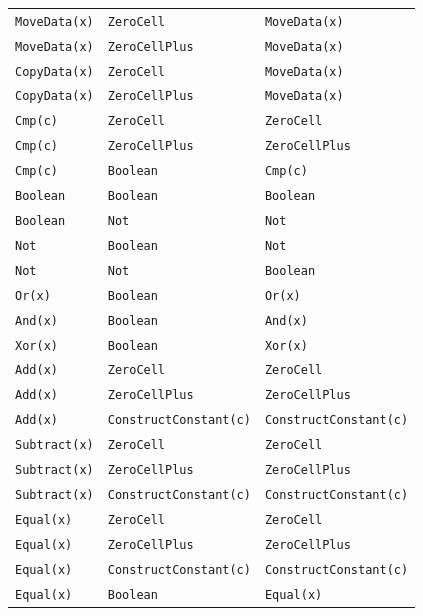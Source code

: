 \begin{longtable}{R{0.27\textwidth}|L{0.27\textwidth}|Q{0.34\textwidth}}
\texttt{MoveData(x)} & \texttt{ZeroCell} & \texttt{MoveData(x)} \\
\texttt{MoveData(x)} & \texttt{ZeroCellPlus} & \texttt{MoveData(x)} \\
\hline

\texttt{CopyData(x)} & \texttt{ZeroCell} & \texttt{MoveData(x)} \\
\texttt{CopyData(x)} & \texttt{ZeroCellPlus} & \texttt{MoveData(x)} \\
\hline

\texttt{Cmp(c)} & \texttt{ZeroCell} & \texttt{ZeroCell} \\
\texttt{Cmp(c)} & \texttt{ZeroCellPlus} & \texttt{ZeroCellPlus} \\
\texttt{Cmp(c)} & \texttt{Boolean} & \texttt{Cmp(c)} \\
\hline

\texttt{Boolean} & \texttt{Boolean} & \texttt{Boolean} \\
\texttt{Boolean} & \texttt{Not} & \texttt{Not} \\
\hline

\texttt{Not} & \texttt{Boolean} & \texttt{Not} \\
\texttt{Not} & \texttt{Not} & \texttt{Boolean} \\
\hline

\texttt{Or(x)} & \texttt{Boolean} & \texttt{Or(x)} \\
\texttt{And(x)} & \texttt{Boolean} & \texttt{And(x)} \\
\texttt{Xor(x)} & \texttt{Boolean} & \texttt{Xor(x)} \\
\hline

\texttt{Add(x)} & \texttt{ZeroCell} & \texttt{ZeroCell} \\
\texttt{Add(x)} & \texttt{ZeroCellPlus} & \texttt{ZeroCellPlus} \\
\texttt{Add(x)} & \texttt{ConstructConstant(c)} & \texttt{ConstructConstant(c)} \\
\hline

\texttt{Subtract(x)} & \texttt{ZeroCell} & \texttt{ZeroCell} \\
\texttt{Subtract(x)} & \texttt{ZeroCellPlus} & \texttt{ZeroCellPlus} \\
\texttt{Subtract(x)} & \texttt{ConstructConstant(c)} & \texttt{ConstructConstant(c)} \\
\hline

\texttt{Equal(x)} & \texttt{ZeroCell} & \texttt{ZeroCell} \\
\texttt{Equal(x)} & \texttt{ZeroCellPlus} & \texttt{ZeroCellPlus} \\
\texttt{Equal(x)} & \texttt{ConstructConstant(c)} & \texttt{ConstructConstant(c)} \\
\texttt{Equal(x)} & \texttt{Boolean} & \texttt{Equal(x)} \\
\hline


\end{longtable}
